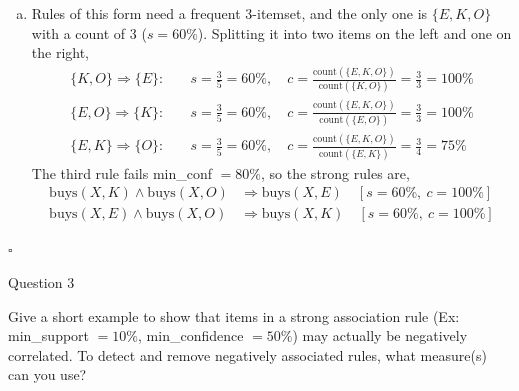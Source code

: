 \documentclass[12pt,letterpaper, onecolumn]{exam}
\begin{document}
\begin{questions}
\begin{solution}
\begin{enumerate}[a.)]
            Apriori is a level-wise generate-and-test method. The candidates $C_k$ are built by joining $L_{k-1}$, so they cannot exist until the pass that found $L_{k-1}$ is done, and the only way to get the support of a candidate is to count it against the transactions. So scan 1 gives $L_1$, scan 2 gives $L_2$, \dots, and scan $k$ gives $L_k$, meaning a frequent $k$-itemset takes $k$ scans to discover. One more scan to count $C_{k+1}$ (and find nothing frequent) is the ``checking whether a $k+1$ itemset is frequent'' step that is excluded. In part a.), $L_3$ only had one itemset, so $C_4$ was empty after the join and that extra scan was not even needed.

            \item Rules of this form need a frequent 3-itemset, and the only one is $\{E,K,O\}$ with a count of 3 ($s=60\%$). Splitting it into two items on the left and one on the right,
            \begin{align*}
                \{K,O\}\Rightarrow\{E\}:&\quad s = \tfrac{3}{5} = 60\%, \quad c = \frac{\text{count}(\{E,K,O\})}{\text{count}(\{K,O\})} = \frac{3}{3} = 100\% \\
                \{E,O\}\Rightarrow\{K\}:&\quad s = \tfrac{3}{5} = 60\%, \quad c = \frac{\text{count}(\{E,K,O\})}{\text{count}(\{E,O\})} = \frac{3}{3} = 100\% \\
                \{E,K\}\Rightarrow\{O\}:&\quad s = \tfrac{3}{5} = 60\%, \quad c = \frac{\text{count}(\{E,K,O\})}{\text{count}(\{E,K\})} = \frac{3}{4} = 75\%
            \end{align*}
            The third rule fails min\_conf $=80\%$, so the strong rules are,
            \begin{align*}
                \text{buys}(X,K)\wedge\text{buys}(X,O) &\Rightarrow \text{buys}(X,E) \quad [s=60\%,\ c=100\%] \\
                \text{buys}(X,E)\wedge\text{buys}(X,O) &\Rightarrow \text{buys}(X,K) \quad [s=60\%,\ c=100\%]
            \end{align*}
        \end{enumerate}

        $\square$
    \end{solution}

    \newpage
    \question Question 3

    Give a short example to show that items in a strong association rule (Ex: min\_support $=10\%$, min\_confidence $=50\%$) may actually be negatively correlated. To detect and remove negatively associated rules, what measure(s) can you use?


\end{questions}
\end{document}
